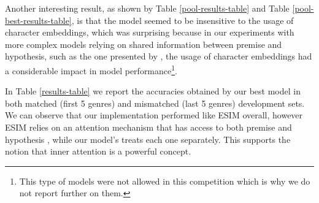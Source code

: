 \documentclass[11pt,letterpaper]{article}
\begin{document}
Another interesting result, as shown by Table \ref{pool-results-table} and Table \ref{pool-best-results-table}, is that the model seemed to be insensitive to the usage of character embeddings, which was surprising because in our experiments with more complex models relying on shared information between premise and hypothesis, such as the one presented by , the usage of character embeddings had a considerable impact in model performance\footnote{This type of models were not allowed in this competition which is why we do not report further on them.}.

In Table \ref{results-table} we report the accuracies obtained by our best model in both matched (first 5 genres) and mismatched (last 5 genres) development sets. We can observe that our implementation performed like ESIM overall, however ESIM relies on an attention mechanism that has access to both premise and hypothesis \cite{chen2017enhanced}, while our model's treats each one separately. This supports the notion that inner attention is a powerful concept.

\end{document}
